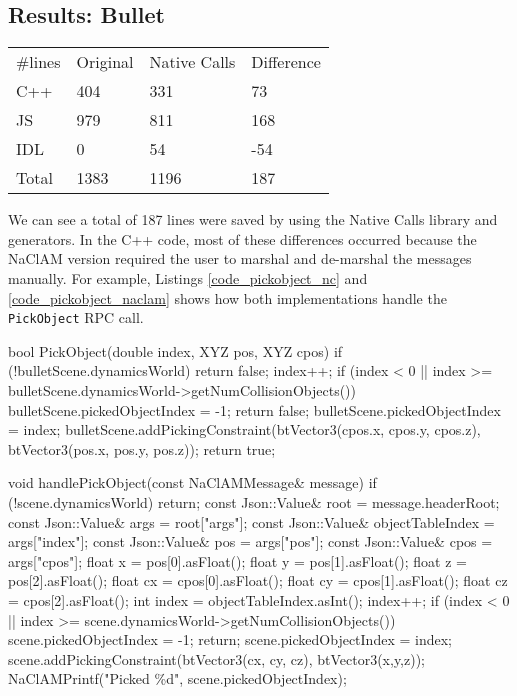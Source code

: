\subsection{Results: Bullet} %
\label{sub:evaluation_usability_bullet}
\begin{table}[h]
\begin{tabular}{llll}
\#lines                    & Original & Native Calls & Difference \\ \cline{2-4} 
\multicolumn{1}{l|}{C++}   & 404      & 331          &  73        \\
\multicolumn{1}{l|}{JS}    & 979      & 811          &  168       \\
\multicolumn{1}{l|}{IDL}   & 0        & 54           &  -54       \\
\multicolumn{1}{l|}{Total} & 1383     & 1196         &  187
\end{tabular}
\end{table}

We can see a total of 187 lines were saved by using the Native Calls library and generators. In the C++ code, most of these differences occurred because the NaClAM version required the user to marshal and de-marshal the messages manually. For example, Listings \ref{code_pickobject_nc} and \ref{code_pickobject_naclam} shows how both implementations handle the \lstinline{PickObject} RPC call.

\begin{code}
bool PickObject(double index, XYZ pos, XYZ cpos) {
  if (!bulletScene.dynamicsWorld) {
    return false;
  }
  index++;
  if (index < 0 || 
       index >= bulletScene.dynamicsWorld->getNumCollisionObjects()) {
    bulletScene.pickedObjectIndex = -1;
    return false;
  }
  bulletScene.pickedObjectIndex = index;
  bulletScene.addPickingConstraint(btVector3(cpos.x, cpos.y, cpos.z), 
                                      btVector3(pos.x, pos.y, pos.z));
  return true;
}
\end{code}


\begin{code}
void handlePickObject(const NaClAMMessage& message) {
  if (!scene.dynamicsWorld) {
    return;
  }
  const Json::Value& root = message.headerRoot;
  const Json::Value& args = root["args"];
  const Json::Value& objectTableIndex = args["index"];
  const Json::Value& pos = args["pos"];
  const Json::Value& cpos = args["cpos"];
  float x = pos[0].asFloat();
  float y = pos[1].asFloat();
  float z = pos[2].asFloat();
  float cx = cpos[0].asFloat();
  float cy = cpos[1].asFloat();
  float cz = cpos[2].asFloat();
  int index = objectTableIndex.asInt();
  index++;
  if (index < 0 || 
             index >= scene.dynamicsWorld->getNumCollisionObjects()) {
    scene.pickedObjectIndex = -1;
    return;
  }
  scene.pickedObjectIndex = index;
  scene.addPickingConstraint(btVector3(cx, cy, cz), btVector3(x,y,z));
  NaClAMPrintf("Picked \%d\n", scene.pickedObjectIndex);
}
\end{code}

